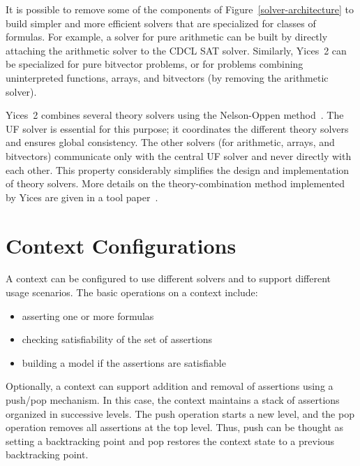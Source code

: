 \documentclass[11pt,twoside,fleqn,openright,titlepage]{cslreport}
\begin{document}
It   is    possible   to   remove   some   of    the   components   of
Figure~\ref{solver-architecture} to  build simpler and  more efficient
solvers that are specialized for  classes of formulas.  For example, a
solver  for pure  arithmetic can  be built  by directly  attaching the
arithmetic solver to  the CDCL SAT solver.  Similarly,  Yices~2 can be
specialized  for pure  bitvector problems,  or for  problems combining
uninterpreted  functions,  arrays,  and  bitvectors (by  removing  the
arithmetic solver).

Yices~2 combines several theory solvers using the Nelson-Oppen
method~\cite{NelsonOppen79}.  The UF solver is essential for this
purpose; it coordinates the different theory solvers and ensures
global consistency. The other solvers (for arithmetic, arrays, and
bitvectors) communicate only with the central UF solver and never
directly with each other.  This property considerably simplifies the
design and implementation of theory solvers.  More details on the
theory-combination method implemented by Yices are given in a tool
paper~\cite{Dutertre:cav2014}.

\section{Context Configurations}
\label{features}

A context can be configured to use different solvers and to support
different usage scenarios. The basic operations on a context
include:
\begin{itemize}
\item asserting one or more formulas
\item checking satisfiability of the set of assertions
\item building a model if the assertions are satisfiable
\end{itemize}
Optionally, a context can support addition and removal of assertions
using a push/pop mechanism.  In this case, the context maintains a
stack of assertions organized in successive levels.  The push
operation starts a new level, and the pop operation removes all
assertions at the top level.  Thus, push can be thought as setting a
backtracking point and pop restores the context state to a previous
backtracking point.
\end{document}
